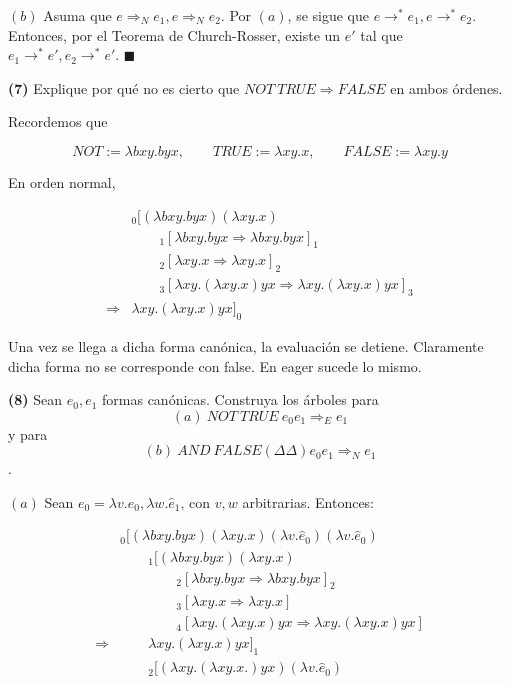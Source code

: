 \documentclass[article, 12pt]{article}
\begin{document}
$(b)$ Asuma que $e \Rightarrow_N e_1, e \Rightarrow_N e_2$. Por $(a)$, se sigue
que $e \to^* e_1, e \to^* e_2$. Entonces, por el Teorema de Church-Rosser,
existe un $e'$ tal que $e_1 \to^* e', e_2 \to^* e'$. $\blacksquare$

\pagebreak

\begin{myframe}
  \textbf{(7)} Explique por qué no es cierto que $NOT ~ TRUE \Rightarrow FALSE$ en
  ambos órdenes.
\end{myframe}

Recordemos que 

\begin{equation*}
  NOT := \lambda bxy. byx, \qquad TRUE := \lambda xy. x, \qquad FALSE
  := \lambda xy.y
\end{equation*}

En orden normal, 

\begin{align*}
&_0[(\lambda bxy.byx)(\lambda xy.x) \\ 
&\qquad_1[\lambda bxy.byx \Rightarrow \lambda bxy.byx]_1 \\ 
&\qquad_2[\lambda xy.x \Rightarrow \lambda xy.x]_2 \\ 
&\qquad _3[\lambda xy.(\lambda xy.x)yx \Rightarrow \lambda xy.(\lambda
xy.x)yx]_3 \\ 
\Rightarrow&\lambda xy.(\lambda xy.x)yx]_0
\end{align*}

Una vez se llega a dicha forma canónica, la evaluación se detiene. Claramente
dicha forma no se corresponde con false. En eager sucede lo mismo.

\pagebreak 

\begin{myframe}
  \textbf{(8)} Sean $e_0, e_1$ formas canónicas. Construya los árboles para 
  $$(a)~ NOT ~ TRUE ~ e_0 e_1 \Rightarrow_E e_1$$ y para 
   $$(b) ~ AND ~ FALSE (\Delta \Delta) e_0 e_1 \Rightarrow_N e_1$$.
\end{myframe}

$(a)$ Sean $e_0 = \lambda v.\hat{e}_0, \lambda w.\hat{e}_1$, con $v, w$
arbitrarias. Entonces:

\begin{align*}
&_0[(\lambda bxy.byx)(\lambda xy.x)(\lambda v. \hat{e}_0)(\lambda v.\hat{e}_0) \\ 
&\qquad_1[(\lambda bxy.byx)(\lambda xy.x) \\ 
&\qquad \qquad _2[\lambda bxy.byx \Rightarrow \lambda bxy.byx]_2 \\ 
&\qquad \qquad _3[\lambda xy.x \Rightarrow \lambda xy.x] \\ 
&\qquad \qquad _4[\lambda xy.(\lambda xy.x)yx \Rightarrow \lambda xy.(\lambda
xy.x)yx] \\ 
\Rightarrow
&\qquad \lambda xy.(\lambda xy.x)yx]_1 \\ 
&\qquad_2[(\lambda xy.(\lambda xy.x.)yx)(\lambda v. \hat{e}_0) \\ 
&
\end{align*}
\end{document}
